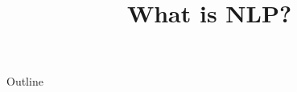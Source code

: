 \documentclass[xcolor=dvipsnames,compress,t,pdf,9pt]{beamer}
\title[\insertframenumber /\inserttotalframenumber]{What is NLP?}
\begin{document}
	\begin{frame}
	\titlepage
	\end{frame}
	
	\begin{frame}{Outline}
	    \tableofcontents
	\end{frame}

	
	

	
	
\end{document}
